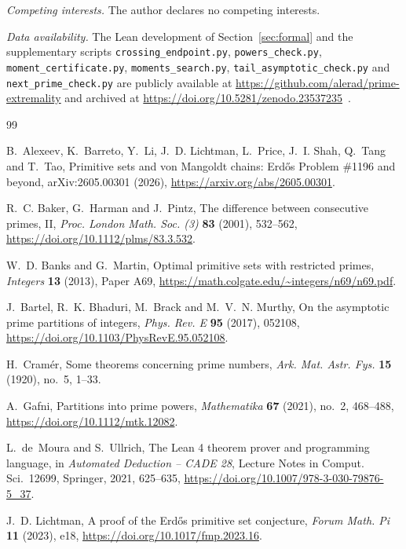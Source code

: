 \documentclass[11pt]{article}
\theoremstyle{remark}
\begin{document}
\emph{Competing interests.} The author declares no competing
interests.

{\sloppy\emph{Data availability.} The Lean development of
Section~\ref{sec:formal} and the supplementary scripts
\texttt{crossing\_endpoint.py}, \texttt{powers\_check.py},
\texttt{moment\_certificate.py}, \texttt{moments\_search.py},
\texttt{tail\_\allowbreak asymptotic\_\allowbreak check.py} and
\texttt{next\_\allowbreak prime\_\allowbreak check.py} are publicly
available at \url{https://github.com/alerad/prime-extremality} and archived at \url{https://doi.org/10.5281/zenodo.23537235}~\cite{Artifact}.\par}

\begin{thebibliography}{99}

B.~Alexeev, K.~Barreto, Y.~Li, J.~D. Lichtman, L.~Price, J.~I. Shah,
Q.~Tang and T.~Tao,
Primitive sets and von Mangoldt chains: Erd\H{o}s Problem \#1196 and
beyond, arXiv:2605.00301 (2026),
\url{https://arxiv.org/abs/2605.00301}.

R.~C. Baker, G.~Harman and J.~Pintz,
The difference between consecutive primes, II,
\emph{Proc. London Math. Soc. (3)} \textbf{83} (2001), 532--562,
\url{https://doi.org/10.1112/plms/83.3.532}.

W.~D. Banks and G.~Martin,
Optimal primitive sets with restricted primes,
\emph{Integers} \textbf{13} (2013), Paper A69,
\url{https://math.colgate.edu/~integers/n69/n69.pdf}.

J.~Bartel, R.~K. Bhaduri, M.~Brack and M.~V.~N. Murthy,
On the asymptotic prime partitions of integers,
\emph{Phys. Rev. E} \textbf{95} (2017), 052108,
\url{https://doi.org/10.1103/PhysRevE.95.052108}.

H.~Cram\'er,
Some theorems concerning prime numbers,
\emph{Ark. Mat. Astr. Fys.} \textbf{15} (1920), no.~5, 1--33.

A.~Gafni,
Partitions into prime powers,
\emph{Mathematika} \textbf{67} (2021), no.~2, 468--488,
\url{https://doi.org/10.1112/mtk.12082}.

L.~de~Moura and S.~Ullrich,
The Lean 4 theorem prover and programming language,
in \emph{Automated Deduction -- CADE 28}, Lecture Notes in Comput.
Sci.\ 12699, Springer, 2021, 625--635,
\url{https://doi.org/10.1007/978-3-030-79876-5_37}.

J.~D. Lichtman,
A proof of the Erd\H{o}s primitive set conjecture,
\emph{Forum Math. Pi} \textbf{11} (2023), e18,
\url{https://doi.org/10.1017/fmp.2023.16}.


\end{thebibliography}
\end{document}
